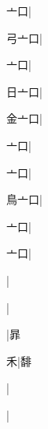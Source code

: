 \begin{multicols}{2}
{{亠口}|{}\par
{\cjk{}弓亠口}|{}\par
{\cjk{}{\cnsym{}　}亠口}|{}\par
{\cjk{}日亠口}|{}\par
{\cjk{}金亠口}|{}\par
{\cjk{}{\cnsym{}　}亠口}|{}\par
{\cjk{}{\cnsym{}　}亠口}|{}\par
{\cjk{}鳥亠口}|{}\par
{\cjk{}{\cnsym{}　}亠口}|{}\par
{\cjk{}{\cnsym{}　}亠口}|{}\par
{\cjk{}{\cnsym{}　}{\cnsym{}　}{\cnsym{}　}}|{}\par
{\cjk{}{\cnsym{}　}{\cnsym{}　}{\cnsym{}　}}|{}\par
{\cjk{}{\cnsym{}　}{\cnsym{}　}{\cnsym{}　}}|{\cjk{}暃}\par
{\cjk{}{\cnsym{}　}{\cnsym{}　}禾}|{\cjk{}馡}\par
{\cjk{}{\cnsym{}　}{\cnsym{}　}{\cnsym{}　}}|{}\par
{}|{}\par
}
\end{multicols}
